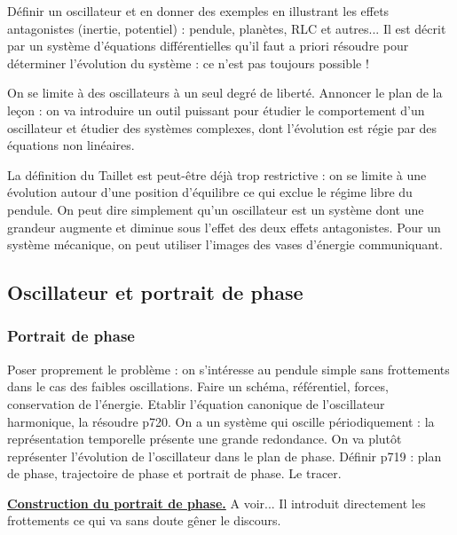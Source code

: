 Définir un oscillateur \cite{Taillet2018} et en donner des exemples en illustrant les effets antagonistes (inertie, potentiel) : pendule, planètes, RLC et autres...
Il est décrit par un système d'équations différentielles qu'il faut a priori résoudre pour déterminer l'évolution du système : ce n'est pas toujours possible !

On se limite à des oscillateurs à un seul degré de liberté.
Annoncer le plan de la leçon : on va introduire un outil puissant pour étudier le comportement d'un oscillateur et étudier des systèmes complexes, dont l'évolution est régie par des équations non linéaires.

\begin{remarque}
La définition du Taillet est peut-être déjà trop restrictive : on se limite à une évolution autour d'une position d'équilibre ce qui exclue le régime libre du pendule.
On peut dire simplement qu'un oscillateur est un système dont une grandeur augmente et diminue sous l'effet des deux effets antagonistes.
Pour un système mécanique, on peut utiliser l'images des vases d'énergie communiquant.
\end{remarque}

\subsection{Oscillateur et portrait de phase}

\subsubsection{Portrait de phase}

Poser proprement le problème : on s'intéresse au pendule simple sans frottements dans le cas des faibles oscillations.
Faire un schéma, référentiel, forces, conservation de l'énergie.
Etablir l'équation canonique de l'oscillateur harmonique, la résoudre \cite{Gie1992} p720.
On a un système qui oscille périodiquement : la représentation temporelle présente une grande redondance.
On va plutôt représenter l'évolution de l'oscillateur dans le plan de phase.
Définir \cite{Gie1992} p719 : plan de phase, trajectoire de phase et portrait de phase.
Le tracer.

\begin{slide}
\href{https://youtu.be/fDek6cYijxI?t=150}{\textbf{Construction du portrait de phase.}}
A voir...
Il introduit directement les frottements ce qui va sans doute gêner le discours.
\end{slide}

